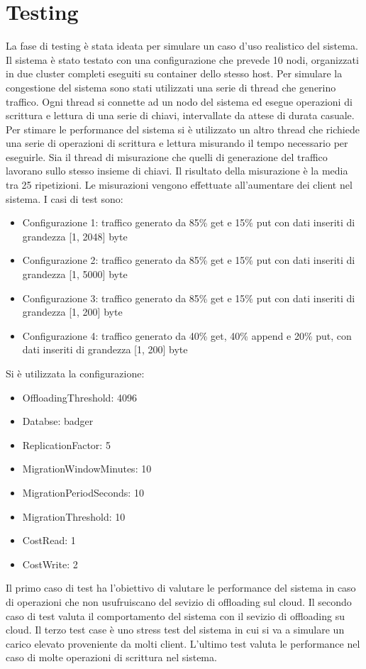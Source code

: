 \documentclass[conference]{IEEEtran}
\begin{document}
\section{Testing}
La fase di testing è stata ideata per simulare un caso d'uso realistico del sistema. Il sistema è stato testato con una
configurazione che prevede 10 nodi, organizzati in due cluster completi eseguiti su container dello stesso host. Per simulare la congestione del sistema sono stati
utilizzati una serie di thread che generino traffico. Ogni thread si connette ad un nodo del sistema
ed esegue operazioni di scrittura e lettura di una serie di chiavi, intervallate da attese di durata casuale. Per stimare le performance del sistema si
è utilizzato un altro thread che richiede una serie di operazioni di scrittura e lettura misurando il tempo necessario per
eseguirle. Sia il thread di misurazione che quelli di generazione del traffico lavorano sullo stesso insieme di chiavi.
Il risultato della misurazione è la media tra 25 ripetizioni.
Le misurazioni vengono effettuate all'aumentare dei client nel sistema. I casi di test sono:
\begin{itemize}
  \item Configurazione 1: traffico generato da 85\% get e 15\% put con dati inseriti di grandezza [1, 2048] byte
  \item Configurazione 2: traffico generato da 85\% get e 15\% put con dati inseriti di grandezza [1, 5000] byte
  \item Configurazione 3: traffico generato da 85\% get e 15\% put con dati inseriti di grandezza [1, 200] byte
  \item Configurazione 4: traffico generato da 40\% get, 40\% append e 20\% put, con dati inseriti di grandezza [1, 200] byte
\end{itemize}
Si è utilizzata la configurazione:
\begin{itemize}
  \item OffloadingThreshold: 4096
  \item Databse: badger
  \item ReplicationFactor: 5
  \item MigrationWindowMinutes: 10
  \item MigrationPeriodSeconds: 10
  \item MigrationThreshold: 10
  \item CostRead: 1
  \item CostWrite: 2
\end{itemize}

Il primo caso di test ha l'obiettivo di valutare le performance del sistema in caso di operazioni che non usufruiscano del
sevizio di offloading sul cloud. Il secondo caso di test valuta il comportamento del sistema con il sevizio di offloading su cloud.
Il terzo test case è uno stress test del sistema in cui si va a simulare un carico elevato proveniente da molti client.
L'ultimo test valuta le performance nel caso di molte operazioni di scrittura nel sistema.
\end{document}
